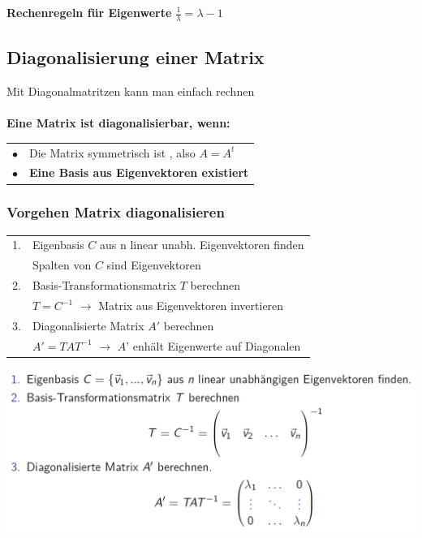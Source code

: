 			\textbf{Rechenregeln für Eigenwerte}
			$\frac{1}{\lambda} = \lambda - 1$ \\		 
		 
		 
		 
		 
		 
		 
		 
		 
		 
		 
		   \subsection{Diagonalisierung einer Matrix}
			Mit Diagonalmatritzen kann man einfach rechnen \\	
			\\
			\textbf{Eine Matrix ist diagonalisierbar, wenn:} \\
			\begin{tabular}{ll}
			$\bullet$ & Die Matrix symmetrisch ist , also $A = A^t$\\
			$\bullet$ & \textbf{Eine Basis aus Eigenvektoren existiert} \\
			\end{tabular}				    
			
			\subsubsection{Vorgehen Matrix diagonalisieren} 
		 \begin{tabular}{ll}
		1. & Eigenbasis $C$ aus n linear unabh. Eigenvektoren finden  \\
		& Spalten von $C$ sind Eigenvektoren\\
		2. & Basis-Transformationsmatrix $T$ berechnen \\
		& $T = C^{-1}$ $\rightarrow$ Matrix aus Eigenvektoren invertieren \\
		3. & Diagonalisierte Matrix $A'$ berechnen \\
		& $A' = T A T^{-1}$ $\rightarrow$ $A$' enhält Eigenwerte auf Diagonalen \\
		\end{tabular}		 
		 
		  \includegraphics[width=0.7\linewidth]{Bilder/matrix-diagonalisieren} \\ 
			
